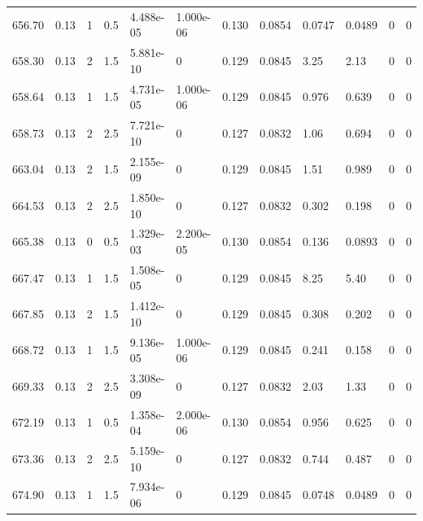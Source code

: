 \documentclass[preview]{standalone}
\begin{document}
{{{{{{{{{{{\begin{tabular}{L{1.2cm}C{1.2cm} C{0.3cm}C{0.5cm} C{1.4cm}C{1.4cm} C{1.4cm}C{1.4cm} C{1.6cm}C{1.6cm} C{1.6cm}C{1.6cm}}
  656.70  &  0.13  & 1     & 0.5 &  4.488e-05  & 1.000e-06  &  0.130&   0.0854& 0.0747 & 0.0489   &  0 & 0  \\ 
  658.30  &  0.13  & 2     & 1.5 &  5.881e-10  & 0  &  0.129&   0.0845& 3.25 & 2.13   &  0 & 0  \\ 
  658.64  &  0.13  & 1     & 1.5 &  4.731e-05  & 1.000e-06  &  0.129&   0.0845& 0.976 & 0.639   &  0 & 0  \\ 
  658.73  &  0.13  & 2     & 2.5 &  7.721e-10  & 0  &  0.127&   0.0832& 1.06 & 0.694   &  0 & 0  \\ 
  663.04  &  0.13  & 2     & 1.5 &  2.155e-09  & 0  &  0.129&   0.0845& 1.51 & 0.989   &  0 & 0  \\ 
  664.53  &  0.13  & 2     & 2.5 &  1.850e-10  & 0  &  0.127&   0.0832& 0.302 & 0.198   &  0 & 0  \\ 
  665.38  &  0.13  & 0     & 0.5 &  1.329e-03  & 2.200e-05  &  0.130&   0.0854& 0.136 & 0.0893   &  0 & 0  \\ 
  667.47  &  0.13  & 1     & 1.5 &  1.508e-05  & 0  &  0.129&   0.0845& 8.25 & 5.40   &  0 & 0  \\ 
  667.85  &  0.13  & 2     & 1.5 &  1.412e-10  & 0  &  0.129&   0.0845& 0.308 & 0.202   &  0 & 0  \\ 
  668.72  &  0.13  & 1     & 1.5 &  9.136e-05  & 1.000e-06  &  0.129&   0.0845& 0.241 & 0.158   &  0 & 0  \\ 
  669.33  &  0.13  & 2     & 2.5 &  3.308e-09  & 0  &  0.127&   0.0832& 2.03 & 1.33   &  0 & 0  \\ 
  672.19  &  0.13  & 1     & 0.5 &  1.358e-04  & 2.000e-06  &  0.130&   0.0854& 0.956 & 0.625   &  0 & 0  \\ 
  673.36  &  0.13  & 2     & 2.5 &  5.159e-10  & 0  &  0.127&   0.0832& 0.744 & 0.487   &  0 & 0  \\ 
  674.90  &  0.13  & 1     & 1.5 &  7.934e-06  & 0  &  0.129&   0.0845& 0.0748 & 0.0489   &  0 & 0  \\ 
\hline 
\end{tabular} 

}}}}}}}}}}}
\end{document}
